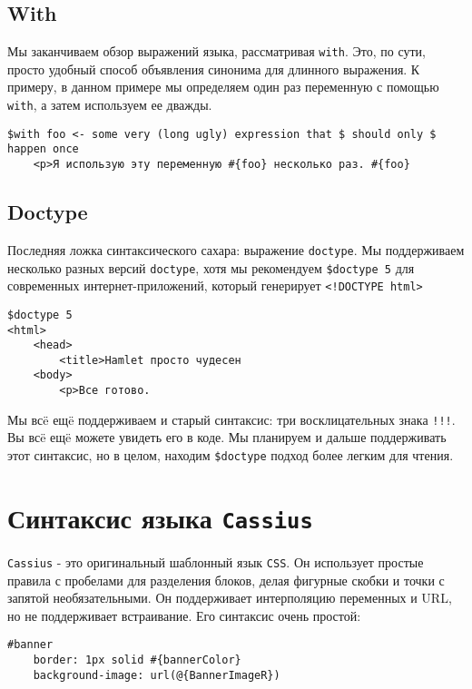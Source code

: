 \subsection{With}

Мы заканчиваем обзор выражений языка, рассматривая \texttt{with}. Это, по сути,
просто удобный способ объявления синонима для длинного выражения. К примеру, 
в данном примере мы определяем один раз переменную с помощью \texttt{with}, а затем
используем ее дважды.

\begin{lstlisting}
$with foo <- some very (long ugly) expression that $ should only $ happen once
    <p>Я использую эту переменную #{foo} несколько раз. #{foo}
\end{lstlisting}

\subsection{Doctype}
Последняя ложка синтаксического сахара: выражение \texttt{doctype}. Мы
поддерживаем несколько разных версий \texttt{doctype}, хотя мы рекомендуем
\lstinline!$doctype 5! для современных интернет-приложений, который генерирует
\lstinline'<!DOCTYPE html>'

\begin{lstlisting}
$doctype 5
<html>
    <head>
        <title>Hamlet просто чудесен
    <body>
        <p>Все готово.
\end{lstlisting}

Мы всë ещë поддерживаем и старый синтаксис: три восклицательных знака \texttt{!!!}.
Вы всë ещë можете увидеть его в коде. Мы планируем и дальше поддерживать этот
синтаксис, но в целом, находим \lstinline!$doctype! подход более легким для чтения.

\section{Синтаксис языка \texttt{Cassius}}
\texttt{Cassius} - это оригинальный шаблонный язык \texttt{CSS}. Он использует простые правила
с пробелами для разделения блоков, делая фигурные скобки и точки с запятой 
необязательными. Он поддерживает интерполяцию переменных и URL, но не поддерживает
встраивание. Его синтаксис очень простой:

\begin{lstlisting}
#banner
    border: 1px solid #{bannerColor}
    background-image: url(@{BannerImageR})
\end{lstlisting}

